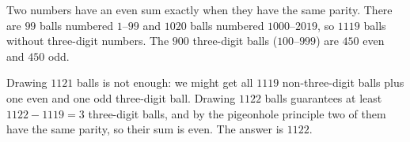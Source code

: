 Two numbers have an even sum exactly when they have the same parity. There are $99$ balls numbered $1$--$99$ and $1020$ balls numbered $1000$--$2019$, so $1119$ balls without three-digit numbers. The $900$ three-digit balls ($100$--$999$) are $450$ even and $450$ odd.

Drawing $1121$ balls is not enough: we might get all $1119$ non-three-digit balls plus one even and one odd three-digit ball. Drawing $1122$ balls guarantees at least $1122-1119=3$ three-digit balls, and by the pigeonhole principle two of them have the same parity, so their sum is even. The answer is $\boxed{1122}$.
